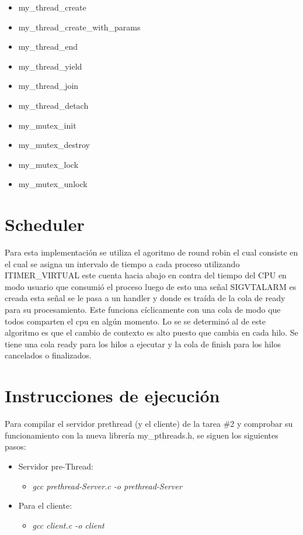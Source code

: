 \documentclass{article}
\begin{document}
\begin{itemize}
  \item my\_thread\_create
  \item my\_thread\_create\_with\_params
  \item my\_thread\_end
  \item my\_thread\_yield
  \item my\_thread\_join
  \item my\_thread\_detach
  \item my\_mutex\_init
  \item my\_mutex\_destroy
  \item my\_mutex\_lock
  \item my\_mutex\_unlock
\end{itemize}

\section{Scheduler}

Para esta implementación se utiliza el agoritmo de round robin el cual consiste en el cual se asigna un intervalo de tiempo a cada proceso utilizando ITIMER_VIRTUAL este cuenta hacia abajo en contra del tiempo del CPU en modo usuario  que consumió el proceso luego de esto una señal SIGVTALARM es creada esta señal se le pasa a un handler y donde es traída de la cola de ready para su procesamiento. Este funciona cíclicamente con una cola de modo que todos comparten el cpu en algún momento. Lo se se determinó al de este algoritmo es que el cambio de contexto es alto puesto que cambia en cada hilo. Se tiene una cola ready para los hilos a ejecutar y la cola de finish para los hilos cancelados o finalizados. 
 

\section{Instrucciones de ejecuci\'on}
Para compilar el servidor prethread (y el cliente) de la tarea \#2 y comprobar su funcionamiento con la nueva librer\'ia my\_pthreads.h, se siguen los siguientes pasos:
\begin{itemize}
  \item Servidor pre-Thread:
  \begin{itemize}
    \item \emph{gcc prethread-Server.c -o prethread-Server}
  \end{itemize}
  \item Para el cliente:
  \begin{itemize}
    \item \emph{gcc client.c -o client}
  \end{itemize}
\end{itemize}
\end{document}
